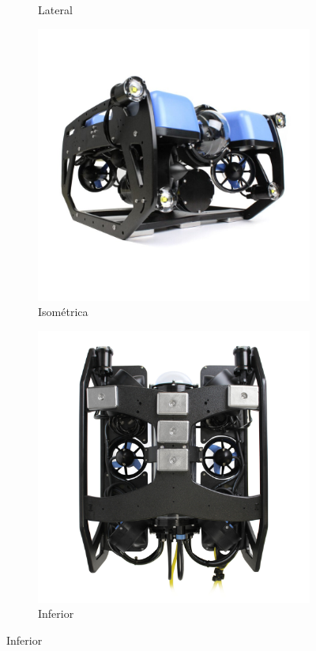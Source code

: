 \documentclass[../main.tex]{subfiles}
\begin{document}
\begin{figure}[H]
\begin{subfigure}{0.2\textwidth}
    \caption{Lateral}
    \label{fig:rov_side}
  \end{subfigure}\hspace{0.5em}%
  \begin{subfigure}{0.2\textwidth}
    \centering
    \includegraphics[width=\textwidth]{images/isometrica_bluerov.jpg}
    \caption{Isométrica}
    \label{fig:rov_iso}
  \end{subfigure}\hspace{0.5em}%
  \begin{subfigure}{0.2\textwidth}
    \centering
    \includegraphics[width=\textwidth]{images/inferior_bluerov.jpg}
    \caption{Inferior}
    \label{fig:rov_bottom}
  \end{subfigure}
  

\end{figure}
\end{document}

